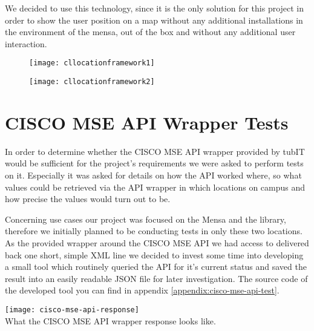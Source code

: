 We decided to use this technology, since it is the only solution for this project in order to show the user position on a map without any additional installations in the environment of the mensa, out of the box and without any additional user interaction.

\begin{figure}
\centering
\begin{minipage}{.5\textwidth}
  \centering
  \texttt{[image: cllocationframework1]}
  \label{fig:cllocationframework1}
\end{minipage}%
\begin{minipage}{.5\textwidth}
  \centering
  \texttt{[image: cllocationframework2]}
  \label{fig:cllocationframework2}
\end{minipage}
\end{figure}


\vspace{0.5cm}

\section{CISCO MSE API Wrapper Tests}

In order to determine whether the CISCO MSE API wrapper provided by tubIT would be sufficient for the project's requirements we were asked to perform tests on it. Especially it was asked for details on how the API worked where, so what values could be retrieved via the API wrapper in which locations on campus and how precise the values would turn out to be.

Concerning use cases our project was focused on the Mensa and the library, therefore we initially planned to be conducting tests in only these two locations. As the provided wrapper around the CISCO MSE API we had access to delivered back one short, simple XML line we decided to invest some time into developing a small tool which routinely queried the API for it's current status and saved the result into an easily readable JSON file for later investigation. The source code of the developed tool you can find in appendix \ref{appendix:cisco-mse-api-test}.

\begin{center}
    \texttt{[image: cisco-mse-api-response]}\\
    What the CISCO MSE API wrapper response looks like.
\end{center}

